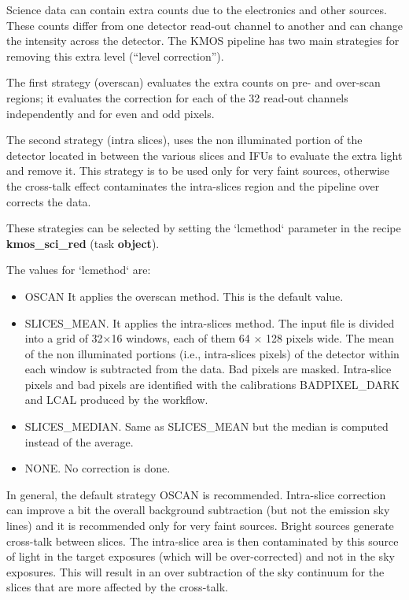 Science data can contain extra counts due to the electronics and other sources. These counts differ from one
detector read-out channel to another and can change the intensity across the detector. 
The KMOS pipeline has two main strategies for removing this extra level (“level correction”).

The first strategy (overscan) evaluates the extra counts on pre- and over-scan regions; 
it evaluates the correction for each of the 32 read-out channels independently and for even and odd pixels.

The second strategy (intra slices), uses the non illuminated portion of the detector located in between the various
slices and IFUs to evaluate the extra light and remove it. This strategy is to be used only for very faint sources,
otherwise the cross-talk effect contaminates the intra-slices region and the pipeline over corrects the data.

These strategies can be selected by setting the `lcmethod` parameter in the recipe \textbf{kmos\_sci\_red} 
(task \textbf{object}).

The values for `lcmethod` are:
\begin{itemize}
\item OSCAN It applies the overscan method. This is the default value.
\item SLICES\_MEAN. It applies the intra-slices method. The input file is divided into a grid of 32×16 windows,
each of them 64 × 128 pixels wide. The mean of the non illuminated portions (i.e., intra-slices pixels) of
the detector within each window is subtracted from the data. Bad pixels are masked. Intra-slice pixels and
bad pixels are identified with the calibrations BADPIXEL\_DARK and LCAL produced by the workflow.
\item SLICES\_MEDIAN. Same as SLICES\_MEAN but the median is computed instead of the average.
\item NONE. No correction is done.
\end{itemize}

In general, the default strategy OSCAN is recommended. 
Intra-slice correction can improve a bit the overall background
subtraction (but not the emission sky lines) and it is recommended only for very faint sources. Bright
sources generate cross-talk between slices. The intra-slice area is then contaminated by this source of light
in the target exposures (which will be over-corrected) and not in the sky exposures. This will result in an over
subtraction of the sky continuum for the slices that are more affected by the cross-talk.


